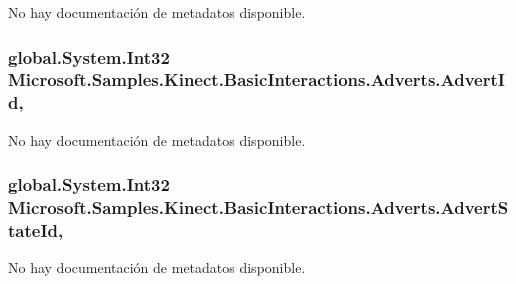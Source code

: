 No hay documentación de metadatos disponible. 

\hypertarget{class_microsoft_1_1_samples_1_1_kinect_1_1_basic_interactions_1_1_adverts_a815d0ab21529092ceea4fb9e6d5c8690}{
\subsubsection[{Advert\-Id}]{\setlength{\rightskip}{0pt plus 5cm}global.\-System.\-Int32 Microsoft.\-Samples.\-Kinect.\-Basic\-Interactions.\-Adverts.\-Advert\-Id\hspace{0.3cm}{\ttfamily [get]}, {\ttfamily [set]}}}\label{class_microsoft_1_1_samples_1_1_kinect_1_1_basic_interactions_1_1_adverts_a815d0ab21529092ceea4fb9e6d5c8690}


No hay documentación de metadatos disponible. 

\hypertarget{class_microsoft_1_1_samples_1_1_kinect_1_1_basic_interactions_1_1_adverts_adc15ed6d0864a4bc1be9d2d311e05ab1}{
\subsubsection[{Advert\-State\-Id}]{\setlength{\rightskip}{0pt plus 5cm}global.\-System.\-Int32 Microsoft.\-Samples.\-Kinect.\-Basic\-Interactions.\-Adverts.\-Advert\-State\-Id\hspace{0.3cm}{\ttfamily [get]}, {\ttfamily [set]}}}\label{class_microsoft_1_1_samples_1_1_kinect_1_1_basic_interactions_1_1_adverts_adc15ed6d0864a4bc1be9d2d311e05ab1}


No hay documentación de metadatos disponible. 

